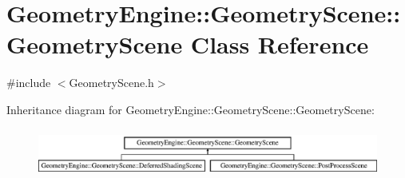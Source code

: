 \hypertarget{class_geometry_engine_1_1_geometry_scene_1_1_geometry_scene}{}\section{Geometry\+Engine\+::Geometry\+Scene\+::Geometry\+Scene Class Reference}
\label{class_geometry_engine_1_1_geometry_scene_1_1_geometry_scene}


{\ttfamily \#include $<$Geometry\+Scene.\+h$>$}

Inheritance diagram for Geometry\+Engine\+::Geometry\+Scene\+::Geometry\+Scene\+:\begin{figure}[H]
\begin{center}
\leavevmode
\includegraphics[height=1.609195cm]{class_geometry_engine_1_1_geometry_scene_1_1_geometry_scene}
\end{center}
\end{figure}
